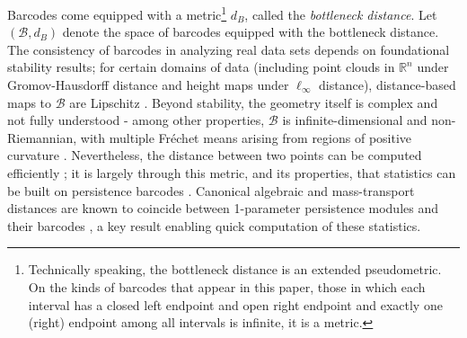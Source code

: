 \documentclass{article}
\theoremstyle{definition}
\newcommand{\BC}{\mathcal{B}}
\begin{document}
Barcodes come equipped with a metric\footnote{Technically speaking, the bottleneck distance is an extended pseudometric. On the kinds of barcodes that appear in this paper, those in which each interval has a closed left endpoint and open right endpoint and exactly one (right) endpoint among all intervals is infinite, it is a metric.} $d_B$, called the \emph{bottleneck distance}. Let $(\BC, d_B)$ denote the space of barcodes equipped with the bottleneck distance. The consistency of barcodes in analyzing real data sets depends on foundational stability results; for certain domains of data (including point clouds in $\mathbb{R}^n$ under Gromov-Hausdorff distance and height maps under $\ell_\infty$ distance), distance-based maps to $\BC$ are Lipschitz \cite{CohenSteiner}. Beyond stability, the geometry itself is complex and not fully understood - among other properties, $\BC$ is infinite-dimensional and non-Riemannian, with multiple Fr\'{e}chet means arising from regions of positive curvature \cite{Che2024}. Nevertheless, the distance between two points can be computed efficiently \cite{kerber2017geometry}; it is largely through this metric, and its properties, that statistics can be built on persistence barcodes \cite{FrechetPDs}. Canonical algebraic and mass-transport distances are known to coincide between 1-parameter persistence modules and their barcodes \cite{bauer2014induced}, a key result enabling quick computation of these statistics.
\end{document}
